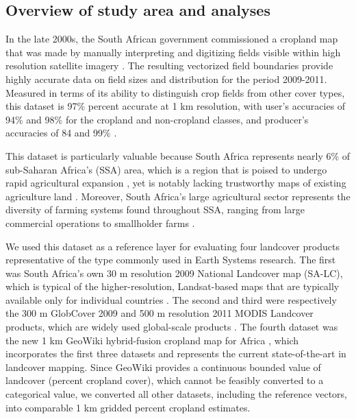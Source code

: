 \documentclass{pnastwo}
\begin{document}
\begin{article}
\vspace{-0.5 cm}
\section{Overview of study area and analyses}
In the late 2000s, the South African government commissioned a cropland map that was made by manually interpreting and digitizing fields visible within high resolution satellite imagery \cite{fourie_better_2009}. The resulting vectorized field boundaries provide highly accurate data on field sizes and distribution for the period 2009-2011. Measured in terms of its ability to distinguish crop fields from other cover types, this dataset is 97\% percent accurate at 1 km resolution, with user's accuracies of 94\% and 98\% for the cropland and non-cropland classes, and producer's accuracies of 84 and 99\%  \cite[][SI]{estes_platform_2015}.

This dataset is particularly valuable because South Africa represents nearly 6\% of sub-Saharan Africa's (SSA) area, which is a region that is poised to undergo rapid agricultural expansion \cite{searchinger_high_2015}, yet is notably lacking trustworthy maps of existing agriculture land \cite{fritz_comparison_2010}. Moreover, South Africa's large agricultural sector represents the diversity of farming systems found throughout SSA, ranging from large commercial operations to smallholder farms \cite{hardy_rainfed_2011,estes_using_2014}.

We used this dataset as a reference layer for evaluating four landcover products representative of the type commonly used in Earth Systems research. The first was South Africa's own 30 m resolution 2009 National Landcover map (SA-LC)\cite{sanbi_national_2009}, which is typical of the higher-resolution, Landsat-based maps that are typically available only for individual countries \cite[e.g.][]{fry_completion_2009}. The second and third were respectively the 300 m GlobCover 2009 \cite{arino_global_2012} and 500 m resolution 2011 MODIS Landcover products, which are widely used global-scale products \cite[e.g.][]{gross_monitoring_2013, shackelford_conservation_2015}. The fourth dataset was the new 1 km GeoWiki hybrid-fusion cropland map for Africa \cite{fritz_mapping_2015}, which incorporates the first three datasets and represents the current state-of-the-art in landcover mapping.  Since GeoWiki provides a continuous bounded value of landcover (percent cropland cover), which cannot be feasibly converted to a categorical value, we converted all other datasets, including the reference vectors, into comparable 1 km gridded percent cropland estimates. 


\end{article}
\end{document}
